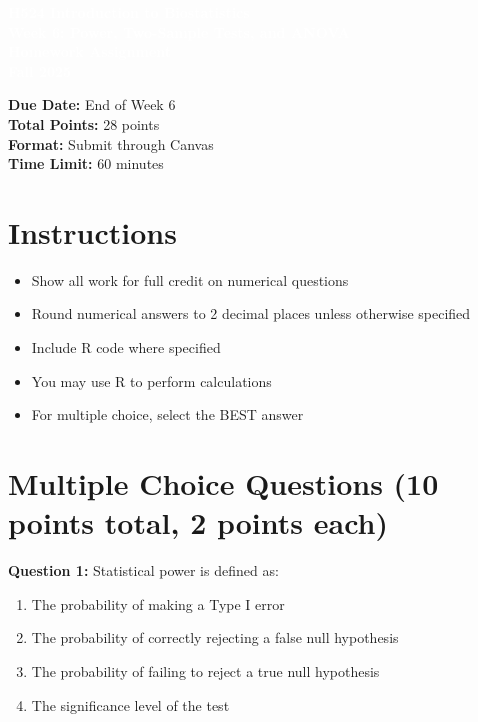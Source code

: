 \documentclass[11pt]{article}
\title{}
\author{}
\date{}
\begin{document}
\begin{tcolorbox}[colback=osaorange,colframe=black,boxrule=2pt,arc=0pt,left=3pt,right=3pt,top=6pt,bottom=6pt,boxsep=2pt]
\centering
\textcolor{white}{\textbf{\Large H524 Introduction to Biostatistics}}\\
\textcolor{white}{\textbf{\Large Week 6: Power, Two-Sample Tests, and ANOVA}}\\
\textcolor{white}{\textbf{\Large Homework Assignment}}\\
\textcolor{white}{\textbf{\Large Fall 2025}}
\end{tcolorbox}

\vspace{8pt}

\noindent\textbf{Due Date:} End of Week 6\\
\textbf{Total Points:} 28 points\\
\textbf{Format:} Submit through Canvas\\
\textbf{Time Limit:} 60 minutes

\section*{Instructions}

\begin{itemize}
\item Show all work for full credit on numerical questions
\item Round numerical answers to 2 decimal places unless otherwise specified
\item Include R code where specified
\item You may use R to perform calculations
\item For multiple choice, select the BEST answer
\end{itemize}

\section*{Multiple Choice Questions (10 points total, 2 points each)}

\textbf{Question 1:} Statistical power is defined as:

\begin{enumerate}[label=\Alph*.]
\item The probability of making a Type I error
\item The probability of correctly rejecting a false null hypothesis
\item The probability of failing to reject a true null hypothesis
\item The significance level of the test
\end{enumerate}
\end{document}
